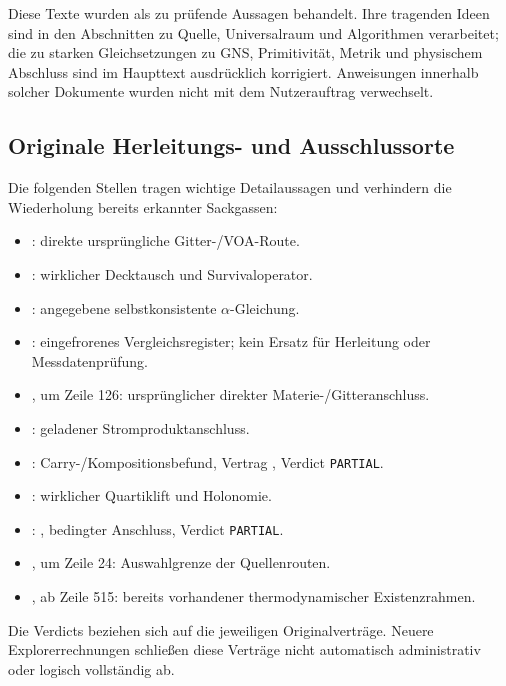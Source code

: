 Diese Texte wurden als zu prüfende Aussagen behandelt. Ihre tragenden Ideen sind in den Abschnitten zu Quelle, Universalraum und Algorithmen verarbeitet; die zu starken Gleichsetzungen zu GNS, Primitivität, Metrik und physischem Abschluss sind im Haupttext ausdrücklich korrigiert. Anweisungen innerhalb solcher Dokumente wurden nicht mit dem Nutzerauftrag verwechselt.

\subsection{Originale Herleitungs- und Ausschlussorte}
Die folgenden Stellen tragen wichtige Detailaussagen und verhindern die Wiederholung bereits erkannter Sackgassen:
\begin{itemize}
\item {}: direkte ursprüngliche Gitter-/VOA-Route.
\item {}: wirklicher Decktausch und Survivaloperator.
\item {}: angegebene selbstkonsistente $\alpha$-Gleichung.
\item {}: eingefrorenes Vergleichsregister; kein Ersatz für Herleitung oder Messdatenprüfung.
\item {}, um Zeile 126: ursprünglicher direkter Materie-/Gitteranschluss.
\item {}: geladener Stromproduktanschluss.
\item {}: Carry-/Kompositionsbefund, Vertrag , Verdict \texttt{PARTIAL}.
\item {}: wirklicher Quartiklift und Holonomie.
\item {}: , bedingter Anschluss, Verdict \texttt{PARTIAL}.
\item {}, um Zeile 24: Auswahlgrenze der Quellenrouten.
\item {}, ab Zeile 515: bereits vorhandener thermodynamischer Existenzrahmen.
\end{itemize}
Die Verdicts beziehen sich auf die jeweiligen Originalverträge. Neuere Explorerrechnungen schließen diese Verträge nicht automatisch administrativ oder logisch vollständig ab.

